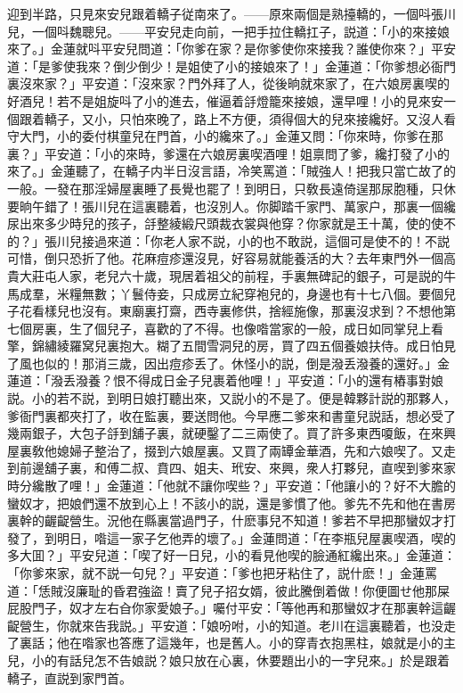 迎到半路，只見來安兒跟着轎子従南來了。——原來兩個是熟擡轎的，一個呌張川兒，一個呌魏聰兒。——平安兒走向前，一把手拉住轎扛子，説道：「小的來接娘來了。」金蓮就呌平安兒問道：「你爹在家？是你爹使你來接我？誰使你來？」平安道：「是爹使我來？倒少倒少！是姐使了小的接娘來了！」金蓮道：「你爹想必衙門裏沒來家？」平安道：「沒來家？門外拜了人，從後晌就來家了，在六娘房裏喫的好酒兒！若不是姐旋呌了小的進去，催逼着㧱燈籠來接娘，還早哩！小的見來安一個跟着轎子，又小，只怕來晚了，路上不方便，須得個大的兒來接纔好。又沒人看守大門，小的委付棋童兒在門首，小的纔來了。」金蓮又問：「你來時，你爹在那裏？」平安道：「小的來時，爹還在六娘房裏喫酒哩！姐禀問了爹，纔打發了小的來了。」金蓮聽了，在轎子内半日沒言語，冷笑罵道：「賊強人！把我只當亡故了的一般。一發在那淫婦屋裏睡了長覺也罷了！到明日，只敎長遠倚逞那尿胞種，只休要晌午錯了！張川兒在這裏聽着，也沒別人。你脚踏千家門、萬家户，那裏一個纔尿出來多少時兒的孩子，㧱整綾緞尺頭裁衣裳與他穿？你家就是王十萬，使的使不的？」張川兒接過來道：「你老人家不説，小的也不敢説，這個可是使不的！不説可惜，倒只恐折了他。花麻痘疹還沒見，好容易就能養活的大？去年東門外一個高貴大莊屯人家，老兒六十歲，現居着祖父的前程，手裏無碑記的銀子，可是説的牛馬成羣，米糧無數；丫鬟侍妾，只成房立紀穿袍兒的，身邊也有十七八個。要個兒子花看樣兒也沒有。東廟裏打齋，西寺裏修供，捨經施像，那裏沒求到？不想他第七個房裏，生了個兒子，喜歡的了不得。也像喒當家的一般，成日如同掌兒上看擎，錦繡綾羅窝兒裏抱大。糊了五間雪洞兒的房，買了四五個養娘扶侍。成日怕見了風也似的！那消三歲，因出痘疹丢了。休怪小的説，倒是潑丢潑養的還好。」金蓮道：「潑丢潑養？恨不得成日金子兒裹着他哩！」平安道：「小的還有樁事對娘説。小的若不説，到明日娘打聽出來，又説小的不是了。便是韓夥計説的那夥人，爹衙門裏都夾打了，收在監裏，要送問他。今早應二爹來和書童兒説話，想必受了幾兩銀子，大包子㧱到舖子裏，就硬鑿了二三兩使了。買了許多東西嗄飯，在來興屋裏敎他媳婦子整治了，掇到六娘屋裏。又買了兩罈金華酒，先和六娘喫了。又走到前邊舖子裏，和傅二叔、賁四、姐夫、玳安、來興，衆人打夥兒，直喫到爹來家時分纔散了哩！」金蓮道：「他就不讓你喫些？」平安道：「他讓小的？好不大膽的蠻奴才，把娘們還不放到心上！不該小的説，還是爹慣了他。爹先不先和他在書房裏幹的齷齪營生。況他在縣裏當過門子，什麽事兒不知道！爹若不早把那蠻奴才打發了，到明日，喒這一家子乞他弄的壞了。」金蓮問道：「在李瓶兒屋裏喫酒，喫的多大囬？」平安兒道：「喫了好一日兒，小的看見他喫的臉通紅纔出來。」金蓮道：「你爹來家，就不説一句兒？」平安道：「爹也把牙粘住了，説什麽！」金蓮罵道：「恁賊沒廉耻的昏君強盜！賣了兒子招女婿，彼此騰倒着做！你便圖せ他那屎屁股門子，奴才左右㒲你家愛娘子。」囑付平安：「等他再和那蠻奴才在那裏幹這齷齪營生，你就來告我説。」平安道：「娘吩咐，小的知道。老川在這裏聽着，也没走了裏話；他在喒家也答應了這幾年，也是舊人。小的穿青衣抱黑柱，娘就是小的主兒，小的有話兒怎不告娘説？娘只放在心裏，休要題出小的一字兒來。」於是跟着轎子，直説到家門首。

